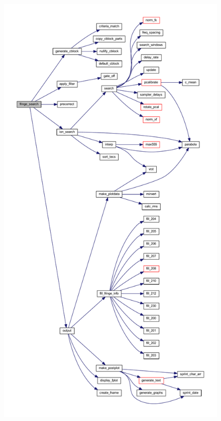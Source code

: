 \begin{figure}[tb]
  \centering
  \includegraphics[width=.9\linewidth]{./fringe_search_graph.pdf}
  \label{fig:fringesearchgraph}
\end{figure}

